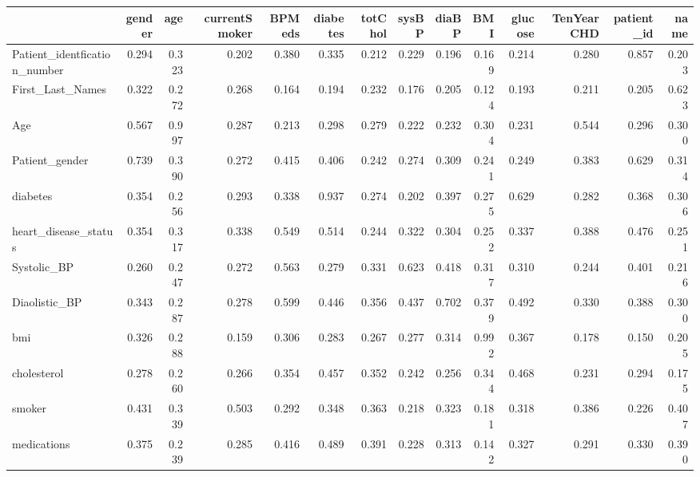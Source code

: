 \begin{tabular}{lrrrrrrrrrrrrr}
\toprule
 & gender & age & currentSmoker & BPMeds & diabetes & totChol & sysBP & diaBP & BMI & glucose & TenYearCHD & patient_id & name \\
\midrule
Patient_identfication_number & 0.294 & 0.323 & 0.202 & 0.380 & 0.335 & 0.212 & 0.229 & 0.196 & 0.169 & 0.214 & 0.280 & 0.857 & 0.203 \\
First_Last_Names & 0.322 & 0.272 & 0.268 & 0.164 & 0.194 & 0.232 & 0.176 & 0.205 & 0.124 & 0.193 & 0.211 & 0.205 & 0.623 \\
Age & 0.567 & 0.997 & 0.287 & 0.213 & 0.298 & 0.279 & 0.222 & 0.232 & 0.304 & 0.231 & 0.544 & 0.296 & 0.300 \\
Patient_gender & 0.739 & 0.390 & 0.272 & 0.415 & 0.406 & 0.242 & 0.274 & 0.309 & 0.241 & 0.249 & 0.383 & 0.629 & 0.314 \\
diabetes & 0.354 & 0.256 & 0.293 & 0.338 & 0.937 & 0.274 & 0.202 & 0.397 & 0.275 & 0.629 & 0.282 & 0.368 & 0.306 \\
heart_disease_status & 0.354 & 0.317 & 0.338 & 0.549 & 0.514 & 0.244 & 0.322 & 0.304 & 0.252 & 0.337 & 0.388 & 0.476 & 0.251 \\
Systolic_BP & 0.260 & 0.247 & 0.272 & 0.563 & 0.279 & 0.331 & 0.623 & 0.418 & 0.317 & 0.310 & 0.244 & 0.401 & 0.216 \\
Diaolistic_BP & 0.343 & 0.287 & 0.278 & 0.599 & 0.446 & 0.356 & 0.437 & 0.702 & 0.379 & 0.492 & 0.330 & 0.388 & 0.300 \\
bmi & 0.326 & 0.288 & 0.159 & 0.306 & 0.283 & 0.267 & 0.277 & 0.314 & 0.992 & 0.367 & 0.178 & 0.150 & 0.205 \\
cholesterol & 0.278 & 0.260 & 0.266 & 0.354 & 0.457 & 0.352 & 0.242 & 0.256 & 0.344 & 0.468 & 0.231 & 0.294 & 0.175 \\
smoker & 0.431 & 0.339 & 0.503 & 0.292 & 0.348 & 0.363 & 0.218 & 0.323 & 0.181 & 0.318 & 0.386 & 0.226 & 0.407 \\
medications & 0.375 & 0.239 & 0.285 & 0.416 & 0.489 & 0.391 & 0.228 & 0.313 & 0.142 & 0.327 & 0.291 & 0.330 & 0.390 \\
\bottomrule
\end{tabular}
